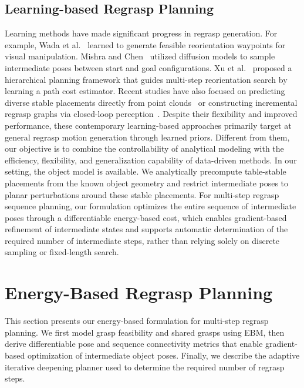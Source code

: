 \documentclass[journal, twoside]{IEEEtran}
\newif\ifshownotes
\newcommand{\lqin}[1]{\ifshownotes{\color{darkgreen}\begin{CJK*}{UTF8}{gkai}\small#1\end{CJK*}}\fi}
\begin{document}
\subsection{Learning-based Regrasp Planning}

Learning methods have made significant progress in regrasp generation. For example, Wada et al.~\cite{wada2022reorientbot} learned to generate feasible reorientation waypoints for visual manipulation. Mishra and Chen~\cite{10610749} utilized diffusion models to sample intermediate poses between start and goal configurations. Xu et al.~\cite{9811547} proposed a hierarchical planning framework that guides multi-step reorientation search by learning a path cost estimator. Recent studies have also focused on predicting diverse stable placements directly from point clouds~\cite{10313307} or constructing incremental regrasp graphs via closed-loop perception~\cite{10955269}. Despite their flexibility and improved performance, these contemporary learning-based approaches primarily target at general regrasp motion generation through learned priors. Different from them, our objective is to combine the controllability of analytical modeling with the efficiency, flexibility, and generalization capability of data-driven methods. In our setting, the object model is available. We analytically precompute table-stable placements from the known object geometry and restrict intermediate poses to planar perturbations around these \lqin{canonical} stable placements. For multi-step regrasp sequence planning, our formulation optimizes the entire sequence of intermediate poses through a differentiable energy-based cost, which enables gradient-based refinement of intermediate states and supports automatic determination of the required number of intermediate steps, rather than relying solely on discrete sampling or fixed-length search.

\section{Energy-Based Regrasp Planning}
\label{sec_regrasp_planning}
This section presents our energy-based formulation for multi-step regrasp planning. We first model grasp feasibility and shared grasps using EBM, then derive differentiable pose and sequence connectivity metrics that enable gradient-based optimization of intermediate object poses. Finally, we describe the adaptive iterative deepening planner used to determine the required number of regrasp steps.
\end{document}
